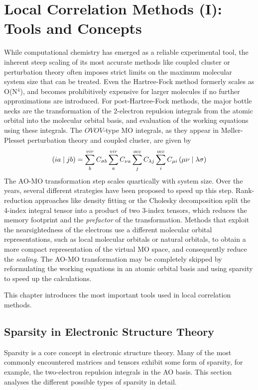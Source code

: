 \chapter{Local Correlation Methods (I): Tools and Concepts \label{cha:LOCAL0}}

While computational chemistry has emerged as a reliable experimental tool, the inherent steep scaling of its most accurate methods like coupled cluster or perturbation theory often imposes strict limits on the maximum molecular system size that can be treated. Even the Hartree-Fock method formerly scales as O(N$^4$), and becomes prohibitively expensive for larger molecules if no further approximations are introduced. For post-Hartree-Fock methods, the major bottle necks are the transformation of the 2-electron repulsion integrals from the atomic orbital into the molecular orbital basis, and evaluation of the working equations using these integrals. The $OVOV$-type MO integrals, as they appear in M{\o}ller-Plesset perturbation theory and coupled cluster, are given by
\begin{equation}
\left( ia \mid jb \right) = \sum^{vir}_b C_{\sigma b} \sum^{vir}_a C_{\nu a} \sum^{occ}_j C_{\lambda j} \sum^{occ}_i C_{\mu i} \left( \mu\nu \mid \lambda\sigma \right)
\end{equation}
The AO-MO transformation step scales quartically with system size. Over the years, several different strategies have been proposed to speed up this step. Rank-reduction approaches like density fitting or the Cholesky decomposition split the 4-index integral tensor into a product of two 3-index tensors, which reduces the memory footprint and the \emph{prefactor} of the transformation. Methods that exploit the nearsightedness of the electrons use a different molecular orbital representations, such as local molecular orbitals or natural orbitals, to obtain a more compact representation of the virtual MO space, and consequently reduce the \emph{scaling}. The AO-MO transformation may be completely skipped by reformulating the working equations in an atomic orbital basis and using sparsity to speed up the calculations.

This chapter introduces the most important tools used in local correlation methods.

\section{Sparsity in Electronic Structure Theory}

Sparsity is a core concept in electronic structure theory. Many of the most commonly encountered matrices and tensors exhibit some form of sparsity, for example, the two-electron repulsion integrals in the AO basis. This section analyses the different possible types of sparsity in detail.

